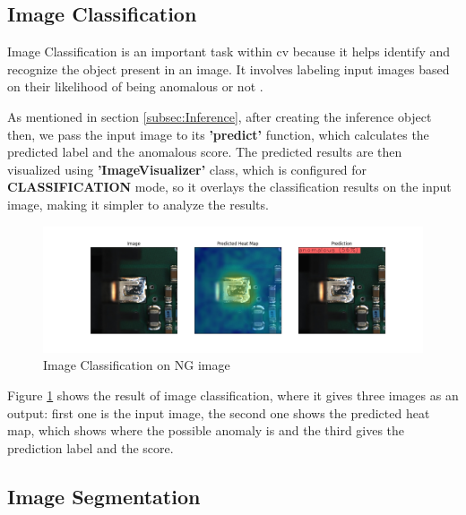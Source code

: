 \subsection{Image Classification}
\label{subsec:Image Classification}

Image Classification is an important task within \gls{cv} because it helps identify and recognize the object present in an image. It involves labeling input images based on their likelihood of being anomalous or not \cite{FANG2020100980}.

As mentioned in section \ref{subsec:Inference}, after creating the inference object then, we pass the input image to its \textbf{'predict'} function, which calculates the predicted label and the anomalous score. The predicted results are then visualized using \textbf{'ImageVisualizer'} class, which is configured for \textbf{CLASSIFICATION} mode, so it overlays the classification results on the input image, making it simpler to analyze the results.

\begin{figure}[ht!]
    \centering
    \includegraphics[width=1\linewidth]{Images/anomalous_image_classification.jpg}
    \caption{Image Classification on NG image}
    \label{fig:Image classification on NG image}
\end{figure}

Figure \ref{fig:Image classification on NG image} shows the result of image classification, where it gives three images as an output: first one is the input image, the second one shows the predicted heat map, which shows where the possible anomaly is and the third gives the prediction label and the score.

\subsection{Image Segmentation}

